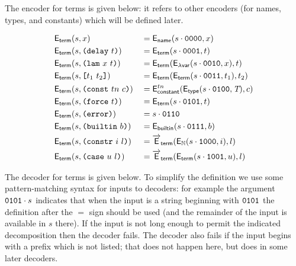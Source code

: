 \noindent The encoder for terms is given below: it refers to other encoders (for
names, types, and constants) which will be defined later.

\begin{alignat*}{2}
&  \mathsf{E}_{\mathsf{term}}(s,x)                 &&= \mathsf{E}_{\mathsf{name}}(s \cdot \mathtt{0000},x) \\
&  \mathsf{E}_{\mathsf{term}}(s, \texttt{(delay}\ t\texttt{)})        &&=\mathsf{E}_{\mathsf{term}}(s \cdot \mathtt{0001}, t) \\
&  \mathsf{E}_{\mathsf{term}}(s, \texttt{(lam}\ x\ t\texttt{)})       &&= \mathsf{E}_{\mathsf{term}}(\mathsf{E}_{\mathsf{\text{$\lambda$}var}}(s \cdot \mathtt{0010}, x), t) \\
&  \mathsf{E}_{\mathsf{term}}(s, \texttt{[}t_1\ t_2\texttt{]}) &&= \mathsf{E}_{\mathsf{term}}(\mathsf{E}_{\mathsf{term}}(s \cdot \mathtt{0011}, t_1), t_2)\\
&  \mathsf{E}_{\mathsf{term}}(s, \texttt{(const}\ tn\ c\texttt{)})    &&= \mathsf{E}_{\mathsf{constant}}^{tn}(\mathsf{E}_{\mathsf{type}}(s \cdot \mathtt{0100}, \textit{T}), c) \\
&  \mathsf{E}_{\mathsf{term}}(s, \texttt{(force}\ t\texttt{)})        &&= \mathsf{E}_{\mathsf{term}}(s \cdot \mathtt{0101}, t) \\
&  \mathsf{E}_{\mathsf{term}}(s, \texttt{(error)})           &&= s \cdot \mathtt{0110} \\
&  \mathsf{E}_{\mathsf{term}}(s, \texttt{(builtin}\ b\texttt{)})      &&= \mathsf{E}_{\mathsf{builtin}}(s \cdot \mathtt{0111}, b) \\
&  \mathsf{E}_{\mathsf{term}}(s, \texttt{(constr}\ i\ l\texttt{)})    &&= \overrightarrow{\mathsf{E}}_{\mathsf{term}}(\mathsf{E}_{\mathbb{N}}(s \cdot \mathtt{1000}, i), l) \\
&  \mathsf{E}_{\mathsf{term}}(s, \texttt{(case}\ u\ l\texttt{)})      &&= \overrightarrow{\mathsf{E}}_{\mathsf{term}}(\mathsf{E}_{\mathsf{term}}(s \cdot \mathtt{1001}, u), l)
\end{alignat*}

\noindent The decoder for terms is given below.  To simplify the definition we
use some pattern-matching syntax for inputs to decoders: for example the
argument $\mathtt{0101} \cdot s$ indicates that when the input is a string
beginning with $\mathtt{0101}$ the definition after the $=$ sign should be used
(and the remainder of the input is available in $s$ there).  If the input is not
long enough to permit the indicated decomposition then the decoder fails.  The
decoder also fails if the input begins with a prefix which is not listed; that
does not happen here, but does in some later decoders.

